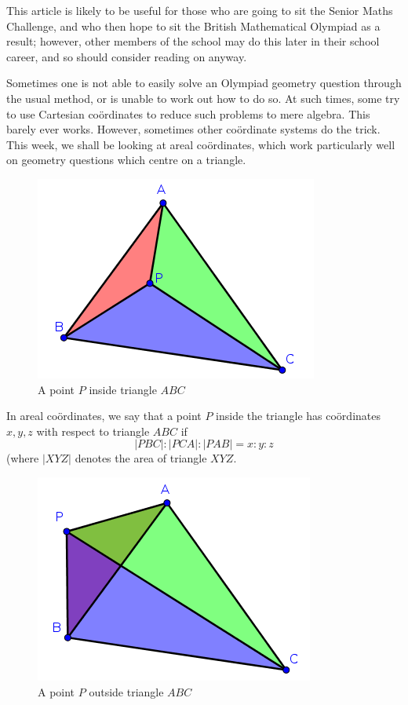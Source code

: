This article is likely to be useful for those who are going to sit the Senior Maths Challenge, and who then hope to sit the British Mathematical Olympiad as a result; however, other members of the school may do this later in their school career, and so should consider reading on anyway.

Sometimes one is not able to easily solve an Olympiad geometry question through the usual method, or is unable to work out how to do so. At such times, some try to use Cartesian coördinates to reduce such problems to mere algebra. This barely ever works. However, sometimes other coördinate systems do the trick. This week, we shall be looking at areal coördinates, which work particularly well on geometry questions which centre on a triangle.

\begin{figure}
\centering
\includegraphics{areals.png}
\caption{A point \(P\) inside triangle \(ABC\)}
\end{figure}

In areal coördinates, we say that a point \(P\) inside the triangle has coördinates \(x,y,z\) with respect to triangle \(ABC\) if \[|PBC|:|PCA|:|PAB|=x:y:z\]
(where \(|XYZ|\) denotes the area of triangle \(XYZ\).

\begin{figure}
\includegraphics{areals2.png}
\caption{A point \(P\) outside triangle \(ABC\)}
\end{figure}

